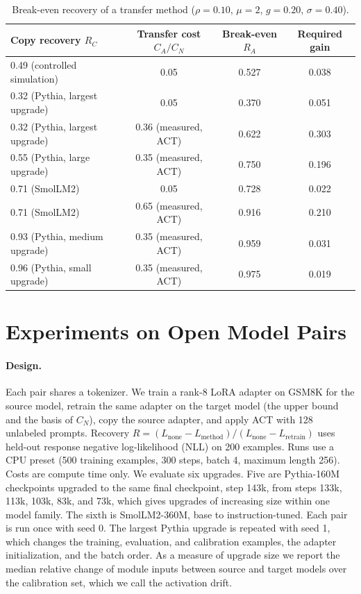 \documentclass[preprint,12pt,authoryear]{elsarticle}
\begin{document}
\begin{table}[t]
\centering
\caption{Break-even recovery of a transfer method ($\rho=0.10$, $\mu=2$, $g=0.20$, $\sigma=0.40$).}\label{tab:breakeven}
\begin{tabular}{lccc}
\toprule
Copy recovery $R_C$ & Transfer cost $C_A/C_N$ & Break-even $R_A$ & Required gain\\
\midrule
0.49 (controlled simulation) & 0.05 & 0.527 & 0.038\\
0.32 (Pythia, largest upgrade) & 0.05 & 0.370 & 0.051\\
0.32 (Pythia, largest upgrade) & 0.36 (measured, ACT) & 0.622 & 0.303\\
0.55 (Pythia, large upgrade) & 0.35 (measured, ACT) & 0.750 & 0.196\\
0.71 (SmolLM2) & 0.05 & 0.728 & 0.022\\
0.71 (SmolLM2) & 0.65 (measured, ACT) & 0.916 & 0.210\\
0.93 (Pythia, medium upgrade) & 0.35 (measured, ACT) & 0.959 & 0.031\\
0.96 (Pythia, small upgrade) & 0.35 (measured, ACT) & 0.975 & 0.019\\
\bottomrule
\end{tabular}
\end{table}

\section{Experiments on Open Model Pairs}\label{sec:pairs}

\paragraph{Design.} Each pair shares a tokenizer. We train a rank-8 LoRA adapter on GSM8K \citep{cobbe2021gsm8k} for the
source model, retrain the same adapter on the target model (the upper bound and the basis of $C_N$), copy the source adapter,
and apply ACT with 128 unlabeled prompts. Recovery $R=(L_{\text{none}}-L_{\text{method}})/(L_{\text{none}}-L_{\text{retrain}})$
uses held-out response negative log-likelihood (NLL) on 200 examples. Runs use a CPU preset (500 training examples, 300 steps,
batch 4, maximum length 256). Costs are compute time only. We evaluate six upgrades. Five are Pythia-160M checkpoints \citep{biderman2023pythia}
upgraded to the same final checkpoint, step 143k, from steps 133k, 113k, 103k, 83k, and 73k, which gives upgrades of increasing size within one model family. The sixth is SmolLM2-360M, base to instruction-tuned.
Each pair is run once with seed 0. The largest Pythia upgrade is repeated with seed 1, which changes the training, evaluation, and calibration examples, the adapter initialization, and the batch order. As a measure of upgrade size we report the median relative change of
module inputs between source and target models over the calibration set, which we call the activation drift.
\end{document}
